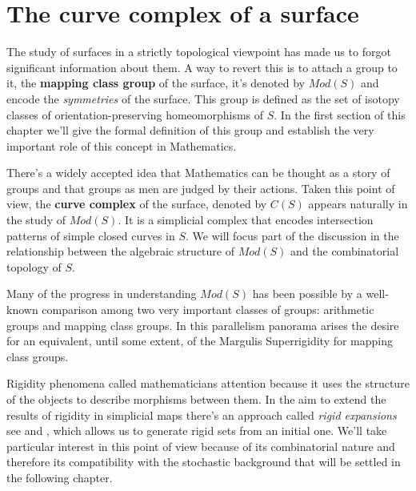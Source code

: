 
\chapter{The curve complex of a surface} %

\label{Chapter1} %



The study of surfaces in a strictly topological viewpoint has made us to forgot significant information about them. A way to revert this is to attach a group to it, the \textbf{mapping class group} of the surface, it's denoted by $Mod(S)$ and encode the \textit{symmetries} of the surface. This group is defined as the set of isotopy classes of orientation-preserving homeomorphisms of $S$. In the first section of this chapter we'll give the formal definition of this group and establish the very important role of this concept in Mathematics. 

There's a widely accepted idea that Mathematics can be thought as a story of groups and that groups as men are judged by their actions. Taken this point of view, the \textbf{curve complex} of the surface, denoted by $C(S)$ appears naturally in the study of $Mod(S)$. It is a simplicial complex that encodes intersection patterns of simple closed curves in $S$. We will focus part of the discussion in the relationship between the algebraic structure of $Mod(S)$ and the combinatorial topology of $S$.

Many of the progress in understanding $Mod(S)$ has been possible by a well-known comparison among two very important classes of groups: arithmetic groups and mapping class groups. In this parallelism panorama arises the desire for an equivalent, until some extent, of the Margulis Superrigidity for mapping class groups.

Rigidity phenomena called mathematicians attention because it uses the structure of the objects to describe morphisms between them. In the aim to extend the results of rigidity in simplicial maps there's an approach called \textit{rigid expansions} see \cite[Aramayona 16]{rigidExpJA} and \cite[Hernandez 16]{rigidExpJH}, which allows us to generate rigid sets from an initial one. We'll take particular interest in this point of view because of its combinatorial nature and therefore its compatibility with the stochastic background that will be settled in the following chapter.

